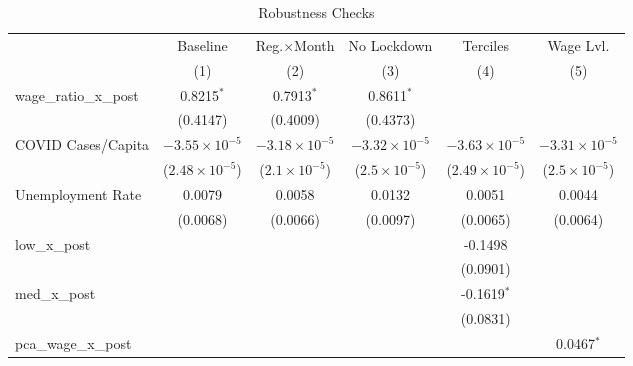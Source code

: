 
\begin{table}[htbp]
   \caption{\label{tab:robustness} Robustness Checks}
   \bigskip
   \centering
   \begin{tabular}{lccccc}
      \toprule
                              & Baseline                & Reg.×Month             & No Lockdown            & Terciles                & Wage Lvl. \\   
                              & (1)                     & (2)                    & (3)                    & (4)                     & (5)\\  
      \midrule 
      wage\_ratio\_x\_post    & 0.8215$^{*}$            & 0.7913$^{*}$           & 0.8611$^{*}$           &                         &   \\   
                              & (0.4147)                & (0.4009)               & (0.4373)               &                         &   \\   
      COVID Cases/Capita      & $-3.55\times 10^{-5}$   & $-3.18\times 10^{-5}$  & $-3.32\times 10^{-5}$  & $-3.63\times 10^{-5}$   & $-3.31\times 10^{-5}$\\    
                              & ($2.48\times 10^{-5}$)  & ($2.1\times 10^{-5}$)  & ($2.5\times 10^{-5}$)  & ($2.49\times 10^{-5}$)  & ($2.5\times 10^{-5}$)\\    
      Unemployment Rate       & 0.0079                  & 0.0058                 & 0.0132                 & 0.0051                  & 0.0044\\   
                              & (0.0068)                & (0.0066)               & (0.0097)               & (0.0065)                & (0.0064)\\   
      low\_x\_post            &                         &                        &                        & -0.1498                 &   \\   
                              &                         &                        &                        & (0.0901)                &   \\   
      med\_x\_post            &                         &                        &                        & -0.1619$^{*}$           &   \\   
                              &                         &                        &                        & (0.0831)                &   \\   
      pca\_wage\_x\_post      &                         &                        &                        &                         & 0.0467$^{*}$\\   

\end{tabular}
\end{table}
